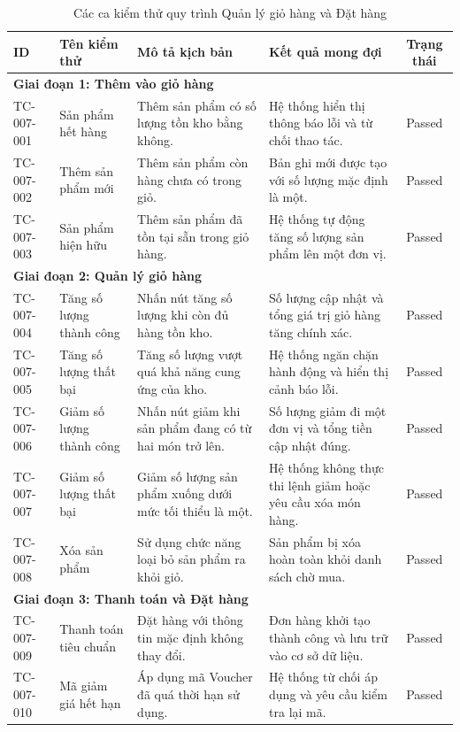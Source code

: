 \begin{table}[H]
\centering
\caption{Các ca kiểm thử quy trình Quản lý giỏ hàng và Đặt hàng}
\label{tab:tc_cart_checkout_full}
\small
\begin{tabularx}{\textwidth}{|l|X|X|X|c|}
\hline
\textbf{ID} & \textbf{Tên kiểm thử} & \textbf{Mô tả kịch bản} & \textbf{Kết quả mong đợi} & \textbf{Trạng thái} \\ \hline
\multicolumn{5}{|l|}{\textbf{Giai đoạn 1: Thêm vào giỏ hàng}} \\ \hline
TC-007-001 & Sản phẩm hết hàng & Thêm sản phẩm có số lượng tồn kho bằng không. & Hệ thống hiển thị thông báo lỗi và từ chối thao tác. & Passed \\ \hline
TC-007-002 & Thêm sản phẩm mới & Thêm sản phẩm còn hàng chưa có trong giỏ. & Bản ghi mới được tạo với số lượng mặc định là một. & Passed \\ \hline
TC-007-003 & Sản phẩm hiện hữu & Thêm sản phẩm đã tồn tại sẵn trong giỏ hàng. & Hệ thống tự động tăng số lượng sản phẩm lên một đơn vị. & Passed \\ \hline
\multicolumn{5}{|l|}{\textbf{Giai đoạn 2: Quản lý giỏ hàng}} \\ \hline
TC-007-004 & Tăng số lượng thành công & Nhấn nút tăng số lượng khi còn đủ hàng tồn kho. & Số lượng cập nhật và tổng giá trị giỏ hàng tăng chính xác. & Passed \\ \hline
TC-007-005 & Tăng số lượng thất bại & Tăng số lượng vượt quá khả năng cung ứng của kho. & Hệ thống ngăn chặn hành động và hiển thị cảnh báo lỗi. & Passed \\ \hline
TC-007-006 & Giảm số lượng thành công & Nhấn nút giảm khi sản phẩm đang có từ hai món trở lên. & Số lượng giảm đi một đơn vị và tổng tiền cập nhật đúng. & Passed \\ \hline
TC-007-007 & Giảm số lượng thất bại & Giảm số lượng sản phẩm xuống dưới mức tối thiểu là một. & Hệ thống không thực thi lệnh giảm hoặc yêu cầu xóa món hàng. & Passed \\ \hline
TC-007-008 & Xóa sản phẩm & Sử dụng chức năng loại bỏ sản phẩm ra khỏi giỏ. & Sản phẩm bị xóa hoàn toàn khỏi danh sách chờ mua. & Passed \\ \hline
\multicolumn{5}{|l|}{\textbf{Giai đoạn 3: Thanh toán và Đặt hàng}} \\ \hline
TC-007-009 & Thanh toán tiêu chuẩn & Đặt hàng với thông tin mặc định không thay đổi. & Đơn hàng khởi tạo thành công và lưu trữ vào cơ sở dữ liệu. & Passed \\ \hline
TC-007-010 & Mã giảm giá hết hạn & Áp dụng mã Voucher đã quá thời hạn sử dụng. & Hệ thống từ chối áp dụng và yêu cầu kiểm tra lại mã. & Passed \\ \hline

\end{tabularx}
\end{table}
